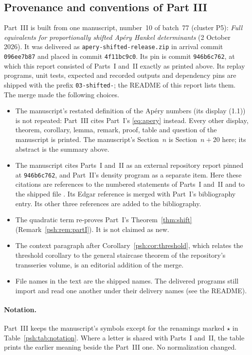 \documentclass[11pt,a4paper]{article}
\numberwithin{equation}{section}
\theoremstyle{remark}\newtheorem{remark}[theorem]{Remark}
\begin{document}
\subsection{Provenance and conventions of Part III}
\label{psh:sec:provenance}
Part~III is built from one manuscript, number~10 of batch~77 (cluster
P5): \emph{Full equivalents for proportionally shifted Ap\'ery Hankel
determinants} (2 October 2026). It was delivered as
\texttt{apery-shifted-release.zip} in arrival commit \texttt{096ee7b87} and
placed in commit \texttt{4f11bc9c0}. Its pin is commit \texttt{946b6c762},
at which this report consisted of Parts~I and~II exactly as printed above.
Its replay programs, unit tests, expected and recorded outputs and
dependency pins are shipped with the prefix \texttt{03-shifted-}; the README
of this report lists them. The merge made the following choices.
\begin{itemize}[leftmargin=*,itemsep=1pt]
\item The manuscript's restated definition of the Ap\'ery numbers (its
display (1.1)) is not repeated: Part~III cites Part~I's \eqref{eq:apery}
instead. Every other display, theorem, corollary, lemma, remark, proof,
table and question of the manuscript is printed. The manuscript's
Section~$n$ is Section~$n+20$ here; its abstract is the summary above.
\item The manuscript cites Parts~I and~II as an external repository report
pinned at \texttt{946b6c762}, and Part~II's density program as a separate
item. Here these citations are references to the numbered statements of
Parts~I and~II and to the shipped file
. Its Edgar reference is merged with
Part~I's bibliography entry. Its other three references are added to the
bibliography.
\item The quadratic term re-proves Part~I's Theorem~\ref{thm:shift}
(Remark~\ref{psh:rem:partI}). It is not claimed as new.
\item The context paragraph after Corollary~\ref{psh:cor:threshold}, which
relates the threshold corollary to the general staircase theorem of the
repository's transseries volume, is an editorial addition of the merge.
\item File names in the text are the shipped names. The delivered programs
still import and read one another under their delivery names (see the
README).
\end{itemize}

\paragraph{Notation.} Part~III keeps the manuscript's symbols except for the
renamings marked $\star$ in Table~\ref{psh:tab:notation}. Where a letter is
shared with Parts~I and~II, the table prints the earlier meaning beside the
Part~III one. No normalization changed.
\end{document}
